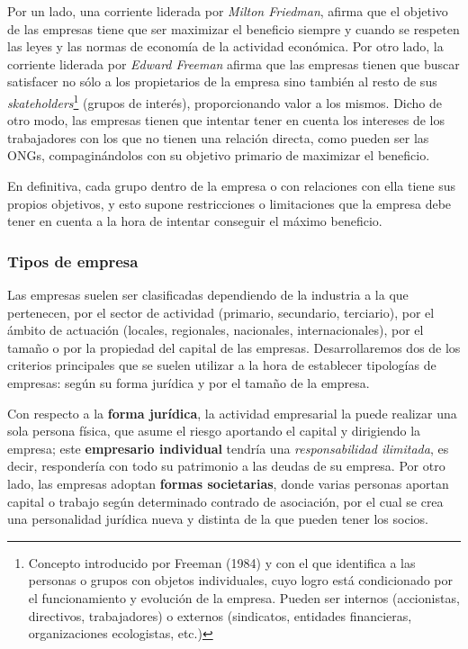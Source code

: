 \documentclass[12pt,a4paper,spanish]{report}
\begin{document}
			Por un lado, una corriente liderada por \textcolor[rgb]{0.5,0.8,0.9}{\emph{Milton Friedman}}, afirma que el objetivo de las empresas tiene que ser maximizar el beneficio siempre y cuando se respeten las leyes y las normas de economía de la actividad económica. Por otro lado, la corriente liderada por \textcolor[rgb]{0.5,0.8,0.9}{\emph{Edward Freeman}} afirma que las empresas tienen que buscar satisfacer no sólo a los propietarios de la empresa sino también al resto de sus \textcolor[rgb]{0.5,0.8,0.9}{\emph{skateholders}}\footnote{Concepto introducido por Freeman (1984) y con el que identifica a las personas o grupos con objetos individuales, cuyo logro está condicionado por el funcionamiento y evolución de la empresa. Pueden ser internos (accionistas, directivos, trabajadores) o externos (sindicatos, entidades financieras, organizaciones ecologistas, etc.)} (grupos de interés), proporcionando valor a los mismos. Dicho de otro modo, las empresas tienen que intentar tener en cuenta los intereses de los trabajadores con los que no tienen una relación directa, como pueden ser las ONGs, compaginándolos con su objetivo primario de maximizar el beneficio.

			En definitiva, cada grupo dentro de la empresa o con relaciones con ella tiene sus propios objetivos, y esto supone restricciones o limitaciones que la empresa debe tener en cuenta a la hora de intentar conseguir el máximo beneficio.

		\subsubsection*{\textcolor[rgb]{0.5,0.8,0.9}Tipos de empresa}
			Las empresas suelen ser clasificadas dependiendo de la industria a la que pertenecen, por el sector de actividad (primario, secundario, terciario), por el ámbito de actuación (locales, regionales, nacionales, internacionales), por el tamaño o por la propiedad del capital de las empresas. Desarrollaremos dos de los criterios principales que se suelen utilizar a la hora de establecer tipologías de empresas: según su forma jurídica y por el tamaño de la empresa.

			Con respecto a la \textbf{forma jurídica}, la actividad empresarial la puede realizar una sola persona física, que asume el riesgo aportando el capital y dirigiendo la empresa; este \textbf{empresario individual} tendría una \textcolor[rgb]{0.5,0.8,0.9}{\emph{responsabilidad ilimitada}}, es decir, respondería con todo su patrimonio a las deudas de su empresa. Por otro lado, las empresas adoptan \textbf{formas societarias}, donde varias personas aportan capital o trabajo según determinado contrado de asociación, por el cual se crea una personalidad jurídica nueva y distinta de la que pueden tener los socios.
\end{document}
